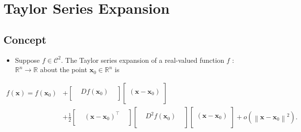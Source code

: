 \section{Taylor Series Expansion}

\subsection{Concept}
\begin{itemize}
	\item Suppose \(f \in \mathcal{C}^{2}\). The Taylor series expansion of a real-valued function \(f\) : \(\mathbb{R}^{n} \rightarrow \mathbb{R}\) about the point \(\boldsymbol{x}_{0} \in \mathbb{R}^{n}\) is
\end{itemize}

\begin{equation*}
	\begin{aligned}
		f(\boldsymbol{x})=f\left(\boldsymbol{x}_{0}\right) 
		& + \left[ \begin{array}{ccc}
			& D f\left(\boldsymbol{x}_{0}\right) & \\
			\end{array}
			\right]
			\left[ \begin{array}{c} 
				 \\ \left(\boldsymbol{x}-\boldsymbol{x}_{0}\right) \\ \\
			\end{array}
			\right] \\
		& +\frac{1}{2}
			\left[ \begin{array}{ccc} 
				& \left(\boldsymbol{x}-\boldsymbol{x}_{0}\right)^{\top}  & \\
			\end{array}
			\right]
			\left[ \begin{array}{ccc}
				& & \\
				& D^2 f\left(\boldsymbol{x}_{0}\right) & \\
				& & \\
			\end{array}
			\right]
			\left[ \begin{array}{c} 
				\\ \left(\boldsymbol{x}-\boldsymbol{x}_{0}\right) \\ \\
			\end{array}
			\right]
			+o\left(\left\|\boldsymbol{x}-\boldsymbol{x}_{0}\right\|^{2}\right) .
	\end{aligned}
\end{equation*}

